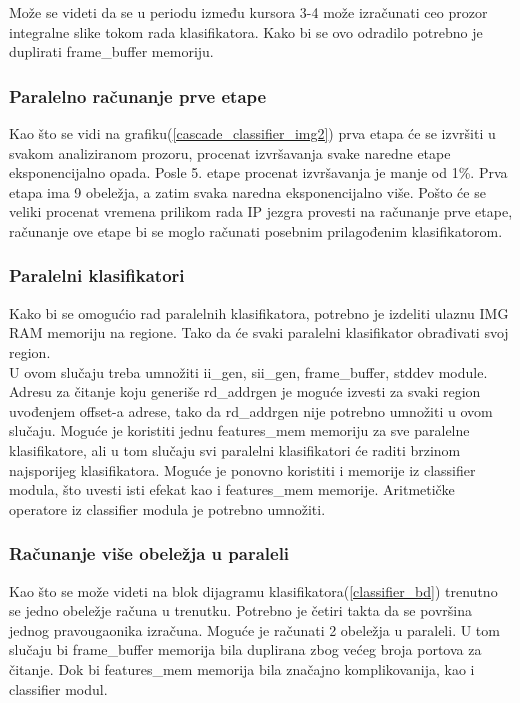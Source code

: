 Može se videti da se u periodu između kursora 3-4 može izračunati ceo prozor integralne slike
tokom rada klasifikatora.
Kako bi se ovo odradilo potrebno je duplirati frame\_buffer memoriju.

\subsubsection{Paralelno računanje prve etape}

Kao što se vidi na grafiku(\ref{cascade_classifier_img2}) prva etapa će se
izvršiti u svakom analiziranom prozoru, procenat izvršavanja svake naredne etape
eksponencijalno opada.
Posle 5. etape procenat izvršavanja je manje od 1\%.
Prva etapa ima 9 obeležja, a zatim svaka naredna
eksponencijalno više.
Pošto će se veliki procenat vremena prilikom rada IP jezgra provesti na
računanje prve etape, računanje ove etape bi se moglo računati posebnim
prilagođenim klasifikatorom.

\subsubsection{Paralelni klasifikatori}

Kako bi se omogućio rad paralelnih klasifikatora, potrebno je izdeliti ulaznu
IMG RAM memoriju na regione.
Tako da će svaki paralelni klasifikator obrađivati svoj region. \\

U ovom slučaju treba umnožiti ii\_gen, sii\_gen, frame\_buffer, stddev module.
Adresu za čitanje koju generiše rd\_addrgen je moguće izvesti za svaki region
uvođenjem offset-a adrese, tako da rd\_addrgen nije potrebno umnožiti u ovom
slučaju.
Moguće je koristiti jednu features\_mem memoriju za sve paralelne klasifikatore,
ali u tom slučaju svi paralelni klasifikatori će raditi brzinom najsporijeg
klasifikatora.
Moguće je ponovno koristiti i memorije iz classifier modula, što uvesti isti
efekat kao i features\_mem memorije.
Aritmetičke operatore iz classifier modula je potrebno umnožiti.

\subsubsection{Računanje više obeležja u paraleli}
Kao što se može videti na blok dijagramu klasifikatora(\ref{classifier_bd})
trenutno se jedno obeležje računa u trenutku.
Potrebno je četiri takta da se površina jednog pravougaonika izračuna.
Moguće je računati 2 obeležja u paraleli.
U tom slučaju bi frame\_buffer memorija bila duplirana zbog većeg broja portova
za čitanje.
Dok bi features\_mem memorija bila značajno komplikovanija, kao i classifier modul.

